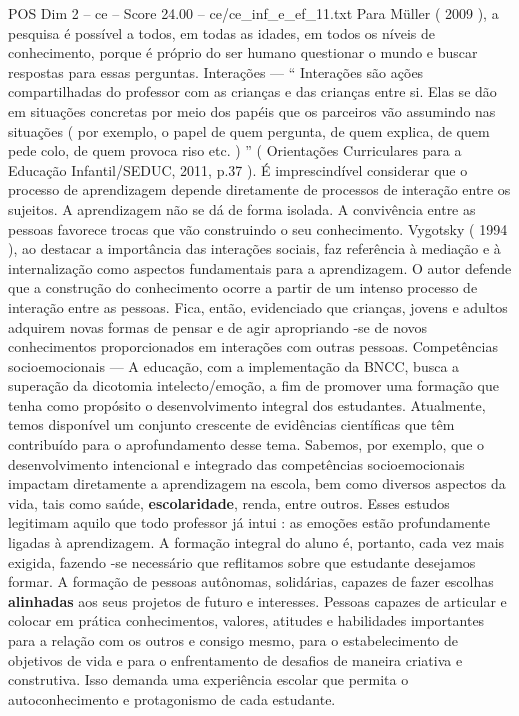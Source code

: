\begin{textsample}{POS Dim 2 – ce – Score 24.00 – ce/ce\_inf\_e\_ef\_11.txt}
Para Müller ( 2009 ), a pesquisa é possível a todos, em todas as idades, em todos os níveis de conhecimento, porque é próprio do ser humano questionar o mundo e buscar respostas para essas perguntas.
Interações — “ Interações são ações compartilhadas do professor com as crianças e das crianças entre si.
Elas se dão em situações concretas por meio dos papéis que os parceiros vão assumindo nas situações ( por exemplo, o papel de quem pergunta, de quem explica, de quem pede colo, de quem provoca riso etc. ) ” ( Orientações Curriculares para a Educação Infantil/SEDUC, 2011, p.37 ).
É imprescindível considerar que o processo de aprendizagem depende diretamente de processos de interação entre os sujeitos.
A aprendizagem não se dá de forma isolada.
A convivência entre as pessoas favorece trocas que vão construindo o seu conhecimento.
Vygotsky ( 1994 ), ao destacar a importância das interações sociais, faz referência à mediação e à internalização como aspectos fundamentais para a aprendizagem.
O autor defende que a construção do conhecimento ocorre a partir de um intenso processo de interação entre as pessoas.
Fica, então, evidenciado que crianças, jovens e adultos adquirem novas formas de pensar e de agir apropriando -se de novos conhecimentos proporcionados em interações com outras pessoas.
Competências socioemocionais — A educação, com a implementação da BNCC, busca a superação da dicotomia intelecto/emoção, a fim de promover uma formação que tenha como propósito o desenvolvimento integral dos estudantes.
Atualmente, temos disponível um conjunto crescente de evidências científicas que têm contribuído para o aprofundamento desse tema.
Sabemos, por exemplo, que o desenvolvimento intencional e integrado das competências socioemocionais impactam diretamente a aprendizagem na escola, bem como diversos aspectos da vida, tais como saúde, \textbf{escolaridade}, renda, entre outros.
Esses estudos legitimam aquilo que todo professor já intui : as emoções estão profundamente ligadas à aprendizagem.
A formação integral do aluno é, portanto, cada vez mais exigida, fazendo -se necessário que reflitamos sobre que estudante desejamos formar.
A formação de pessoas autônomas, solidárias, capazes de fazer escolhas \textbf{alinhadas} aos seus projetos de futuro e interesses.
Pessoas capazes de articular e colocar em prática conhecimentos, valores, atitudes e habilidades importantes para a relação com os outros e consigo mesmo, para o estabelecimento de objetivos de vida e para o enfrentamento de desafios de maneira criativa e construtiva.
Isso demanda uma experiência escolar que permita o autoconhecimento e protagonismo de cada estudante.

\end{textsample}

